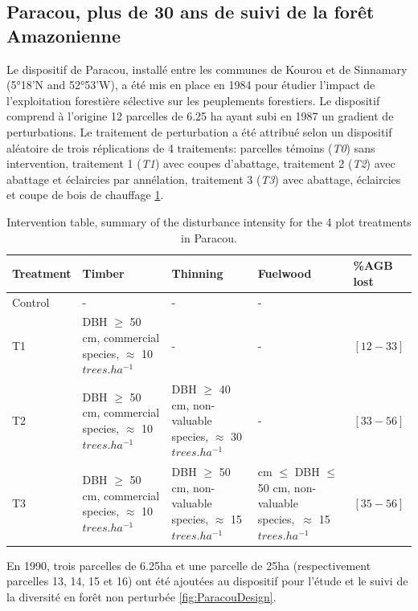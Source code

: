 \documentclass[
  11pt,
  french,
  A4paper,
  extrafontsizes,onecolumn,openright
  ]{memoir}
\begin{document}
\subsection{Paracou, plus de 30 ans de suivi de la forêt
Amazonienne}\label{paracou-plus-de-30-ans-de-suivi-de-la-foret-amazonienne}

Le dispositif de Paracou, installé entre les communes de Kourou et de
Sinnamary (5°18'N and 52°53'W), a été mis en place en 1984 pour étudier
l'impact de l'exploitation forestière sélective sur les peuplements
forestiers. Le dispositif comprend à l'origine 12 parcelles de 6.25 ha
ayant subi en 1987 un gradient de perturbations. Le traitement de
perturbation a été attribué selon un dispositif aléatoire de trois
réplications de 4 traitements: parcelles témoins (\emph{T0}) sans
intervention, traitement 1 (\emph{T1}) avec coupes d'abattage,
traitement 2 (\emph{T2}) avec abattage et éclaircies par annélation,
traitement 3 (\emph{T3}) avec abattage, éclaircies et coupe de bois de
chauffage \ref{tab:InterventionTable}.

\begingroup\fontsize{7}{9}\selectfont

\begin{longtable}[t]{>{\raggedright\arraybackslash}p{5em}|>{\raggedright\arraybackslash}p{8em}|>{\raggedright\arraybackslash}p{8em}|>{\raggedright\arraybackslash}p{11em}|>{\raggedright\arraybackslash}p{4em}}
\caption{\label{tab:InterventionTable}Intervention table, summary of the disturbance intensity for the 4 plot treatments in Paracou.}\\
\hline
Treatment & Timber & Thinning & Fuelwood & \%AGB lost\\
\hline
Control & - & - & - & 0\\
\hline
T1 & DBH $\geq$ 50 cm, commercial species, $\approx$ 10   $trees.ha^{-1}$ & - & - & $[12-33]$\\
\hline
T2 & DBH $\geq$ 50 cm, commercial species, $\approx$ 10  $trees.ha^{-1}$ & DBH $\geq$ 40 cm, non-valuable species, $\approx$ 30   $trees.ha^{-1}$ & - & $[33-56]$\\
\hline
T3 & DBH $\geq$ 50 cm, commercial species, $\approx$ 10  $trees.ha^{-1}$ & DBH $\geq$ 50 cm, non-valuable species, $\approx$ 15  $trees.ha^{-1}$ & 40 cm $\leq$ DBH $\leq$ 50 cm, non-valuable species,\ $\approx$ 15 $trees.ha^{-1}$ & $[35-56]$\\
\hline
\end{longtable}

\endgroup{}

En 1990, trois parcelles de 6.25ha et une parcelle de 25ha
(respectivement parcelles 13, 14, 15 et 16) ont été ajoutées au
dispositif pour l'étude et le suivi de la diversité en forêt non
perturbée \ref{fig:ParacouDesign}.
\end{document}
